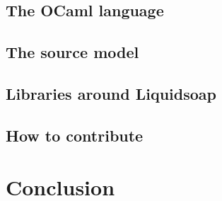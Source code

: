\documentclass{book}
\begin{document}
\section{The OCaml language}

\section{The source model}

\section{Libraries around Liquidsoap}

\section{How to contribute}

\chapter{Conclusion}
\end{document}
